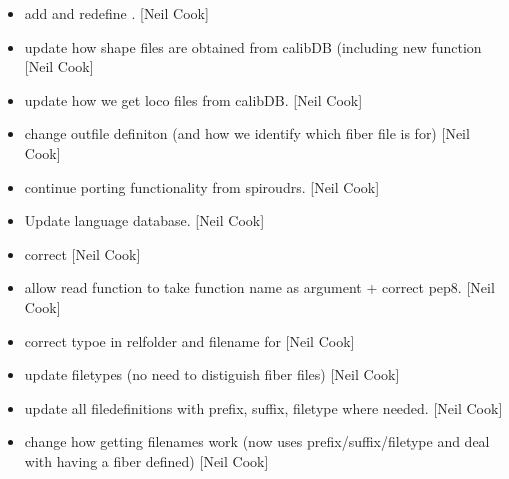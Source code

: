 \documentclass[a4paper,10pt,english]{report}
\begin{document}
\begin{itemize}
\item {} 
 \sphinxhyphen{} add  and redefine
. {[}Neil Cook{]}

\item {} 
 \sphinxhyphen{} update how shape files are obtained from
calibDB (including new function  {[}Neil Cook{]}

\item {} 
 \sphinxhyphen{} update how we get loco files from
calibDB. {[}Neil Cook{]}

\item {} 
 \sphinxhyphen{} change outfile definiton (and how
we identify which fiber file is for) {[}Neil Cook{]}

\item {} 
 \textendash{} continue porting functionality from spiroudrs.
{[}Neil Cook{]}

\item {} 
Update language database. {[}Neil Cook{]}

\item {} 
 \sphinxhyphen{} correct  {[}Neil Cook{]}

\item {} 
 \sphinxhyphen{} allow read function to take function name as argument +
correct pep8. {[}Neil Cook{]}

\item {} 
 \sphinxhyphen{} correct typoe in relfolder and filename for
 {[}Neil Cook{]}

\item {} 
 \sphinxhyphen{} update filetypes (no need to distiguish fiber
files) {[}Neil Cook{]}

\item {} 
 \sphinxhyphen{} update all filedefinitions with prefix, suffix,
filetype where needed. {[}Neil Cook{]}

\item {} 
 \sphinxhyphen{} change how getting filenames work (now uses
prefix/suffix/filetype and deal with having a fiber defined) {[}Neil
Cook{]}


\end{itemize}
\end{document}
